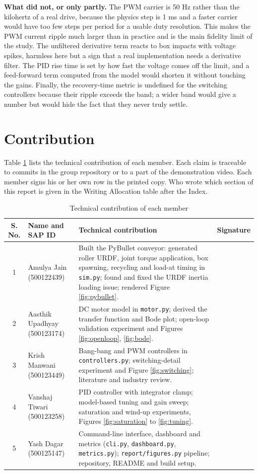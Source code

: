 \documentclass[12pt,a4paper]{article}
\begin{document}
\textbf{What did not, or only partly.} The PWM carrier is 50 Hz rather than the kilohertz of a real drive, because the physics step is 1 ms and a faster carrier would have too few steps per period for a usable duty resolution. This makes the PWM current ripple much larger than in practice and is the main fidelity limit of the study. The unfiltered derivative term reacts to box impacts with voltage spikes, harmless here but a sign that a real implementation needs a derivative filter. The PID rise time is set by how fast the voltage comes off the limit, and a feed-forward term computed from the model would shorten it without touching the gains. Finally, the recovery-time metric is undefined for the switching controllers because their ripple exceeds the band; a wider band would give a number but would hide the fact that they never truly settle.

\section{Contribution}

Table \ref{tab:contrib} lists the technical contribution of each member. Each claim is traceable to commits in the group repository or to a part of the demonstration video. Each member signs his or her own row in the printed copy. Who wrote which section of this report is given in the Writing Allocation table after the Index.

\begin{table}[htbp]
\centering
\caption{Technical contribution of each member}
\label{tab:contrib}
\begin{tabular}{|c|p{2.9cm}|p{6.1cm}|p{2.0cm}|}
\hline
\textbf{S. No.} & \textbf{Name and SAP ID} & \textbf{Technical contribution} & \textbf{Signature} \\ \hline
1 & Amulya Jain (500122439) & Built the PyBullet conveyor: generated roller URDF, joint torque application, box spawning, recycling and load-at timing in \texttt{sim.py}; found and fixed the URDF inertia loading issue; rendered Figure \ref{fig:pybullet}. & \\[0.6cm] \hline
2 & Aasthik Upadhyay (500123174) & DC motor model in \texttt{motor.py}; derived the transfer function and Bode plot; open-loop validation experiment and Figures \ref{fig:openloop}, \ref{fig:bode}. & \\[0.6cm] \hline
3 & Krish Manwani (500123449) & Bang-bang and PWM controllers in \texttt{controllers.py}; switching-detail experiment and Figure \ref{fig:switching}; literature and industry review. & \\[0.6cm] \hline
4 & Vanshaj Tiwari (500123258) & PID controller with integrator clamp; model-based tuning and gain sweep; saturation and wind-up experiments, Figures \ref{fig:saturation} to \ref{fig:tuning}. & \\[0.6cm] \hline
5 & Yash Dagar (500125147) & Command-line interface, dashboard and metrics (\texttt{cli.py}, \texttt{dashboard.py}, \texttt{metrics.py}); \texttt{report/figures.py} pipeline; repository, README and build setup. & \\[0.6cm] \hline
\end{tabular}
\end{table}
\end{document}
